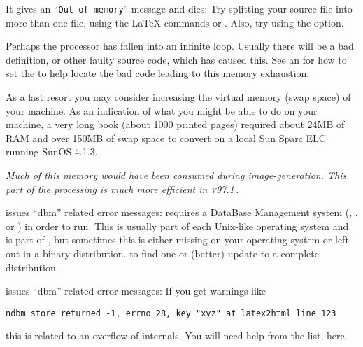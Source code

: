 \begin{htmllist}
\item [It gives an ``\texttt{Out of memory}'' message and dies: ]
Try splitting your source file into more than one file,
using the \LaTeX{} commands  or .
Also, try using the  option.

\begin{changebar}
Perhaps the processor has fallen into an infinite loop.
Usually there will be a bad definition, or other faulty source code,
which has caused this.
See an  for
how to set the   to
help locate the bad code leading to this memory exhaustion.
\end{changebar}

As a last resort you may consider increasing the virtual memory
(swap space) of your machine. As an indication
of what you might be able to do on your machine,
a very long book (about 1000 printed pages) required about
24MB of RAM and over 150MB of swap space to convert on a local Sun Sparc ELC
running SunOS 4.1.3.
\begin{changebar}
\newline\textit
{Much of this memory would have been consumed during image-generation.
This part of the processing is much more efficient in \textsc{v97.1}\,.}
\end{changebar}%


\begin{changebar}
\item [\fn{install-test} issues ``dbm'' related error messages: ]\latex{~\\}%
\latextohtml{} requires a DataBase Management system (,
, or ) in order to run.
This is usually part of each Unix-like operating system and
 is part of , but sometimes this is either missing
on your operating system or left out in a binary \Perl{} distribution.
to find one or (better) update to a complete  distribution.

\item [\fn{latex2html} issues ``dbm'' related error messages: ]
If you get warnings like
\begin{verbatim}
ndbm store returned -1, errno 28, key "xyz" at latex2html line 123
\end{verbatim}
this is related to an overflow of \latextohtml{} internals.
You will need help from the list, here.
\smallskip


\end{changebar}
\end{htmllist}
